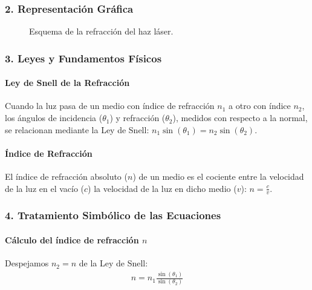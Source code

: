 \subsubsection*{2. Representación Gráfica}
\begin{figure}[H]
    \centering
    \caption{Esquema de la refracción del haz láser.}
\end{figure}

\subsubsection*{3. Leyes y Fundamentos Físicos}
\paragraph*{Ley de Snell de la Refracción}
Cuando la luz pasa de un medio con índice de refracción $n_1$ a otro con índice $n_2$, los ángulos de incidencia ($\theta_1$) y refracción ($\theta_2$), medidos con respecto a la normal, se relacionan mediante la Ley de Snell: $n_1 \sin(\theta_1) = n_2 \sin(\theta_2)$.
\paragraph*{Índice de Refracción}
El índice de refracción absoluto ($n$) de un medio es el cociente entre la velocidad de la luz en el vacío ($c$)  la velocidad de la luz en dicho medio ($v$): $n = \frac{c}{v}$.

\subsubsection*{4. Tratamiento Simbólico de las Ecuaciones}
\paragraph*{Cálculo del índice de refracción $n$}
Despejamos $n_2=n$ de la Ley de Snell:
\begin{gather}
    n = n_1 \frac{\sin(\theta_1)}{\sin(\theta_2)}
\end{gather}

